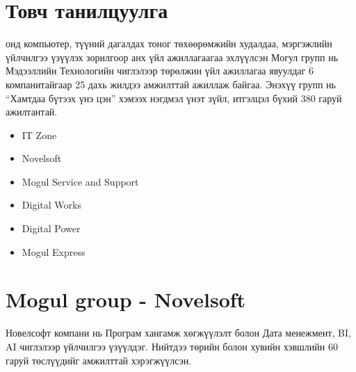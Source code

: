 \section{Товч танилцуулга}
	\quad {} онд компьютер, түүний дагалдах тоног төхөөрөмжийн худалдаа, мэргэжлийн үйлчилгээ үзүүлэх зорилгоор анх үйл ажиллагаагаа эхлүүлсэн Могул групп нь Мэдээллийн Технологийн чиглэлээр төрөлжин үйл ажиллагаа явуулдаг 6 компанитайгаар 25 дахь жилдээ амжилттай ажиллаж байгаа. Энэхүү групп нь “Хамтдаа бүтээх үнэ цэн” хэмээх нэгдмэл үнэт зүйл, итгэлцэл бүхий 380 гаруй ажилтантай.
	

	\begin{itemize}
		\item IT Zone
		\item Novelsoft
		\item Mogul Service and Support
		\item Digital Works
		\item Digital Power
		\item Mogul Express
	 \end{itemize}
\section{Mogul group - Novelsoft}
	\quad \quad	Новелсофт компани нь Програм хангамж хөгжүүлэлт болон Дата менежмент, BI, AI чиглэлээр үйлчилгээ үзүүлдэг. Нийтдээ төрийн болон хувийн хэвшлийн 60 гаруй төслүүдийг амжилттай хэрэгжүүлсэн.
